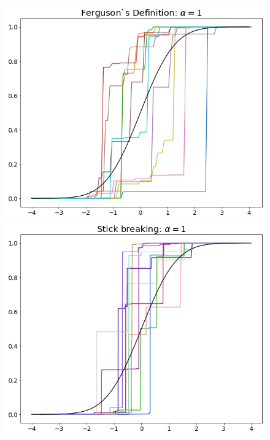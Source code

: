 \documentclass[a4paper, 10pt]{article}
\begin{document}
\begin{enumerate}
\begin{enumerate}
\begin{center}
\begin{figure}
                \includegraphics[scale = 0.3]{a1-2.png}\includegraphics[scale = 0.3]{a1-6.png}

\end{figure}
\end{center}
\end{enumerate}
\end{enumerate}
\end{document}
